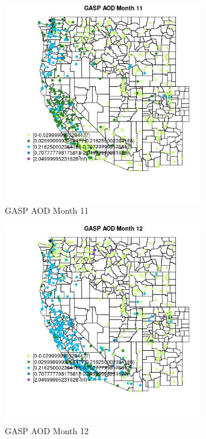 \begin{figure} 
\centering  
\includegraphics[width=0.77\textwidth]{Code_Outputs/Report_ML_input_PM25_Step4_part_e_de_duplicated_aves_compiled_2019-05-21wNAs_MapObsMo11GASP_AOD.jpg} 
\caption{\label{fig:Report_ML_input_PM25_Step4_part_e_de_duplicated_aves_compiled_2019-05-21wNAsMapObsMo11GASP_AOD}GASP AOD Month 11} 
\end{figure} 
 

\begin{figure} 
\centering  
\includegraphics[width=0.77\textwidth]{Code_Outputs/Report_ML_input_PM25_Step4_part_e_de_duplicated_aves_compiled_2019-05-21wNAs_MapObsMo12GASP_AOD.jpg} 
\caption{\label{fig:Report_ML_input_PM25_Step4_part_e_de_duplicated_aves_compiled_2019-05-21wNAsMapObsMo12GASP_AOD}GASP AOD Month 12} 
\end{figure} 
 

